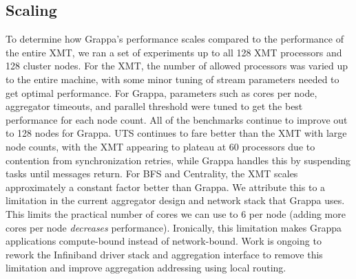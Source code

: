\subsection{Scaling}
%
%
To determine how Grappa's performance scales compared to the performance of the entire XMT, we ran a set of experiments up to all 128 XMT processors and 128 cluster nodes. For the XMT, the number of allowed processors was varied up to the entire machine, with some minor tuning of stream parameters needed to get optimal performance. For Grappa, parameters such as cores per node, aggregator timeouts, and parallel threshold were tuned to get the best performance for each node count. All of the benchmarks continue to improve out to 128 nodes for Grappa. UTS continues to fare better than the XMT with large node counts, with the XMT appearing to plateau at 60 processors due to contention from synchronization retries, while Grappa handles this by suspending tasks until messages return. For BFS and Centrality, the XMT scales approximately a constant factor better than Grappa. We attribute this to a limitation in the current aggregator design and network stack that Grappa uses.  This limits the practical number of cores we can use to 6 per node (adding more cores per node \emph{decreases\/} performance).  Ironically, this limitation makes Grappa applications compute-bound instead of network-bound.  Work is ongoing to rework the Infiniband driver stack and aggregation interface to remove this limitation and improve aggregation addressing using local routing.


